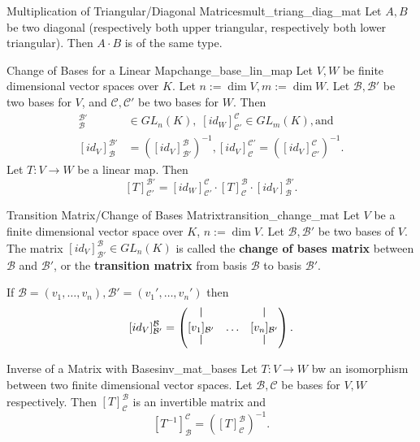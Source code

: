 \begin{lemma}{Multiplication of Triangular/Diagonal Matrices}{mult_triang_diag_mat}
	Let $A, B$ be two diagonal (respectively both upper triangular, respectively both lower triangular). Then $A \cdot B$ is of the same type.
\end{lemma}

\begin{corollary}{Change of Bases for a Linear Map}{change_base_lin_map}
	Let $V, W$ be finite dimensional vector spaces over $K$. Let $n:= \dim V, m := \dim W$. Let $\mathcal{B}, \mathcal{B'}$ be two bases for $V$, and $\mathcal{C}, \mathcal{C'}$ be two bases for $W$. Then
	\begin{align*}
		[id_V]^{\mathcal{B'}}_{\mathcal{B}} &\in GL_n(K),\; [id_W]^{\mathcal{C}}_{\mathcal{C'}} \in GL_m(K), \text{and } \\ [id_V]^{\mathcal{B'}}_{\mathcal{B}} &= ([id_V]^{\mathcal{B}}_{\mathcal{B'}})^{-1},
		[id_V]^{\mathcal{C'}}_{\mathcal{C}} = ([id_V]^{\mathcal{C}}_{\mathcal{C'}})^{-1}.
	\end{align*}
	Let $T:V \to W$ be a linear map. Then
	\[
	[T]^{\mathcal{B'}}_{\mathcal{C'}} = [id_W]^{\mathcal{C}}_{\mathcal{C'}} \cdot [T]^{\mathcal{B}}_{\mathcal{C}} \cdot [id_V]^{\mathcal{B'}}_{\mathcal{B}}.
	\]
\end{corollary}

\begin{definition}{Transition Matrix/Change of Bases Matrix}{transition_change_mat}
	Let $V$ be a finite dimensional vector space over $K$, $n:= \dim V$. Let $\mathcal{B}, \mathcal{B'}$ be two bases of $V$. The matrix $[id_V]^{\mathcal{B}}_{\mathcal{B'}} \in GL_n(K)$ is called the \textbf{change of bases matrix} between $\mathcal{B}$ and $\mathcal{B'}$, or the \textbf{transition matrix} from basis $\mathcal{B}$ to basis $\mathcal{B'}$.
	
	If $\mathcal{B} = (v_1, \hdots , v_n), \mathcal{B'} = (v_1', \hdots , v_n')$ then
	\[
	[id_V]^{\mathcal{B}}_{\mathcal{B'}} = \begin{pmatrix}
		\rule{0.5pt}{2ex} & & \rule{0.5pt}{2ex}\\
		[v_1]_{\mathcal{B'}} & \hdots & [v_n]_{\mathcal{B'}}\\
		\rule{0.5pt}{2ex} & & \rule{0.5pt}{2ex}\\
	\end{pmatrix}.
	\]
\end{definition}

\begin{proposition}{Inverse of a Matrix with Bases}{inv_mat_bases}
	Let $T:V \to W$ bw an isomorphism between two finite dimensional vector spaces. Let $\mathcal{B}, \mathcal{C}$ be bases for $V, W$ respectively. Then $[T]^{\mathcal{B}}_{\mathcal{C}}$ is an invertible matrix and
	\[
	[T^{-1}]^{\mathcal{C}}_{\mathcal{B}} = ([T]^{\mathcal{B}}_{\mathcal{C}})^{-1}.
	\]
\end{proposition}


